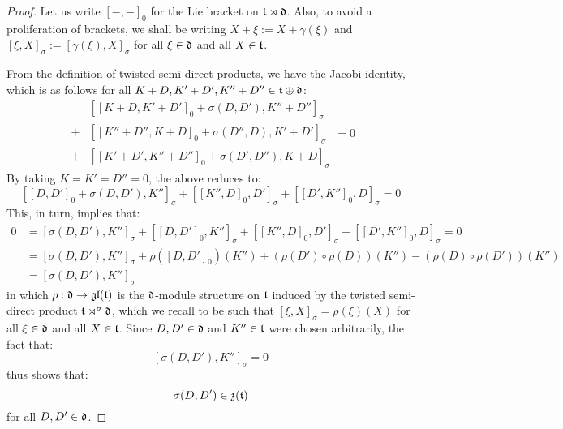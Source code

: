             \begin{proof}
                Let us write $[-, -]_0$ for the Lie bracket on $\mathfrak{t} \rtimes \mathfrak{d}$. Also, to avoid a proliferation of brackets, we shall be writing $X + \xi := X + \gamma(\xi)$ and $[\xi, X]_{\sigma} := [\gamma(\xi), X]_{\sigma}$ for all $\xi \in \mathfrak{d}$ and all $X \in \mathfrak{t}$. 
                
                From the definition of twisted semi-direct products, we have the Jacobi identity, which is as follows for all $K + D, K' + D', K'' + D'' \in \mathfrak{t} \oplus \mathfrak{d}$:
                    $$
                        \begin{aligned}
                            & [[K + D, K' + D']_0 + \sigma(D, D'), K'' + D'']_{\sigma}
                            \\
                            + & [[K'' + D'', K + D]_0 + \sigma(D'', D), K' + D']_{\sigma}
                            \\
                            + & [[K' + D', K'' + D'']_0 + \sigma(D', D''), K + D]_{\sigma}
                        \end{aligned}
                        = 0
                    $$
                By taking $K = K' = D'' = 0$, the above reduces to:
                    $$[[D, D']_0 + \sigma(D, D'), K'']_{\sigma} + [[K'', D]_0, D']_{\sigma} + [[D', K'']_0, D]_{\sigma} = 0$$
                This, in turn, implies that:
                    $$
                        \begin{aligned}
                            0 & = [\sigma(D, D'), K'']_{\sigma} + [[D, D']_0, K'']_{\sigma} + [[K'', D]_0, D']_{\sigma} + [[D', K'']_0, D]_{\sigma} = 0
                            \\
                            & = [\sigma(D, D'), K'']_{\sigma} + \rho( [D, D']_0 )(K'') + ( \rho(D') \circ \rho(D) )(K'') - ( \rho(D) \circ \rho(D') )(K'')
                            \\
                            & = [\sigma(D, D'), K'']_{\sigma}
                        \end{aligned}
                    $$
                in which $\rho: \mathfrak{d} \to \mathfrak{gl}(\mathfrak{t})$ is the $\mathfrak{d}$-module structure on $\mathfrak{t}$ induced by the twisted semi-direct product $\mathfrak{t} \rtimes^{\sigma} \mathfrak{d}$, which we recall to be such that $[\xi, X]_{\sigma} = \rho(\xi)(X)$ for all $\xi \in \mathfrak{d}$ and all $X \in \mathfrak{t}$. Since $D, D' \in \mathfrak{d}$ and $K'' \in \mathfrak{t}$ were chosen arbitrarily, the fact that:
                    $$[\sigma(D, D'), K'']_{\sigma} = 0$$
                thus shows that:
                    $$\sigma(D, D') \in \mathfrak{z}(\mathfrak{t})$$
                for all $D, D' \in \mathfrak{d}$.
            \end{proof}


